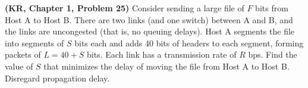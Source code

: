 \documentclass[a4paper,11pt]{exam}
\begin{document}
\begin{questions}

	\question \textbf{(KR, Chapter 1, Problem 25)} 
	Consider sending a large file of $F$ bits from Host A to Host B.  There
	are two links (and one switch) between A and B, and the links are
	uncongested (that is, no queuing delays).  Host A segments the file into
	segments of $S$ bits each and adds 40 bits of headers to each segment,
	forming packets of $L = 40 + S$ bits.  Each link has a transmission rate
	of $R$ bps. Find the value of $S$ that minimizes the delay of moving the
	file from Host A to Host B.  Disregard propagation delay.
    \end{questions}
\end{document}
